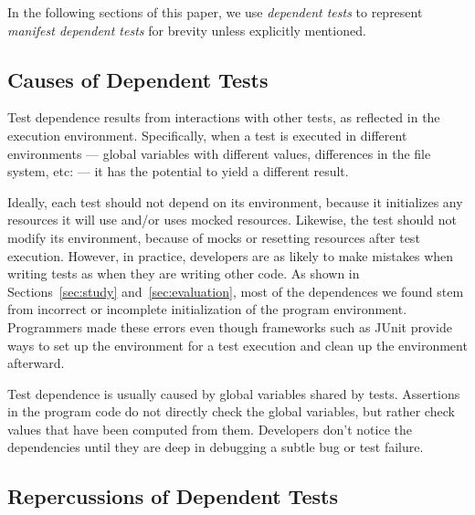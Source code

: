 In the following sections of this paper, we use \textit{dependent tests}
to represent \textit{manifest dependent tests} for brevity
unless explicitly mentioned.





\subsection{Causes of Dependent Tests}


Test dependence results from interactions with other tests, as reflected
in the execution environment.
Specifically, when a
test is executed in different environments --- global variables
with different values, differences in the file system, etc: --- it has the
potential to yield
a different result.  

Ideally, each test should not depend on its environment, because it
initializes any resources it will use and/or uses mocked resources.
Likewise, the test should not modify its environment, because of mocks or
resetting resources after test execution. However, in practice,
developers are as likely
to make mistakes when writing tests as when they are writing other code.
As shown in Sections~\ref{sec:study} and~\ref{sec:evaluation}, most of the dependences we found
stem from incorrect or incomplete initialization
of the program environment.
Programmers made these errors even though frameworks such as
JUnit provide ways to set up the environment for a test execution and clean
up the environment afterward.



Test dependence is usually caused by global variables shared by tests.
Assertions in the program code
do not directly check the global variables,
but rather check values that have been computed from
them.
Developers don't notice the dependencies until they are deep in debugging a
subtle bug or test failure.


\subsection{Repercussions of Dependent Tests}


